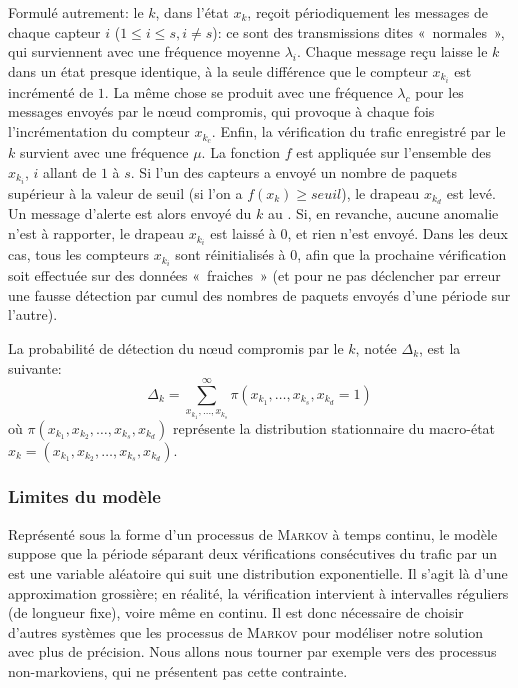 \bigskip
Formulé autrement: le \cn $k$, dans l'état $x_k$, reçoit périodiquement les messages de chaque capteur $i$ ($1\leq i\leq s, i\!\neq\!s$): ce sont des transmissions dites «~normales~», qui surviennent avec une fréquence moyenne $\lambda_i$.
Chaque message reçu laisse le \cn $k$ dans un état presque identique, à la seule différence que le compteur $x_{k_i}$ est incrémenté de $1$.
La même chose se produit avec une fréquence $\lambda_c$ pour les messages envoyés par le nœud compromis, qui provoque à chaque fois l'incrémentation du compteur $x_{k_c}$.
Enfin, la vérification du trafic enregistré par le \cn $k$ survient avec une fréquence $\mu$.
La fonction $f$ est appliquée sur l'ensemble des $x_{k_i}$, $i$ allant de $1$ à $s$.
Si l'un des capteurs a envoyé un nombre de paquets supérieur à la valeur de seuil (\cad si l'on a $f(x_k)\geq \mathit{seuil}$), le drapeau $x_{k_d}$ est levé.
Un message d'alerte est alors envoyé du \cn $k$ au \ch.
Si, en revanche, aucune anomalie n'est à rapporter, le drapeau $x_{k_i}$ est laissé à $0$, et rien n'est envoyé.
Dans les deux cas, tous les compteurs $x_{k_i}$ sont réinitialisés à $0$, afin que la prochaine vérification soit effectuée sur des données «~fraiches~» (et pour ne pas déclencher par erreur une fausse détection par cumul des nombres de paquets envoyés d'une période sur l'autre).

La probabilité de détection du nœud compromis par le \cn $k$, notée $\Delta_k$, est la suivante:
\[\Delta_k=\sum_{x_{k_1},\dots,x_{k_s}}^\infty\pi(x_{k_1},\dots,x_{k_s},x_{k_d}=1)\]
où $\pi(x_{k_1},x_{k_2},\dots,x_{k_{s}},x_{k_d})$ représente la distribution stationnaire du macro-état $x_k\!=\!(x_{k_1},x_{k_2},\dots,x_{k_{s}},x_{k_d})$.

        \subsubsection{Limites du modèle}
Représenté sous la forme d'un processus de \textsc{Markov} à temps continu, le modèle suppose que la période séparant deux vérifications consécutives du trafic par un \cn est une variable aléatoire qui suit une distribution exponentielle.
Il s'agit là d'une approximation grossière; en réalité, la vérification intervient à intervalles réguliers (de longueur fixe), voire même en continu.
Il est donc nécessaire de choisir d'autres systèmes que les processus de \textsc{Markov} pour modéliser notre solution avec plus de précision.
Nous allons nous tourner par exemple vers des processus non-markoviens, qui ne présentent pas cette contrainte.

